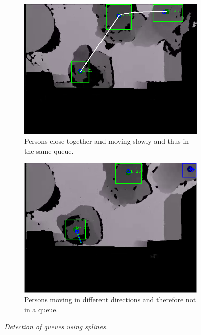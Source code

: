 \begin{figure}[H]
\centering
\begin{subfigure}{.5\textwidth}
  \centering
  \includegraphics[width=0.9\linewidth]{images/visibleQueue.png}
  \caption{Persons close together and moving slowly and thus in the same queue.}
  \label{fig:visible_queue}
\end{subfigure}%
\begin{subfigure}{.5\textwidth}
  \centering
  \includegraphics[width=0.9\linewidth]{images/noQueue.png}
  \caption{Persons moving in different directions and therefore not in a queue.}
  \label{fig:no_queue}
\end{subfigure}
\caption[Queue detection]{\textit{Detection of queues using splines.}}
\label{fig:queue_detection}
\end{figure}



